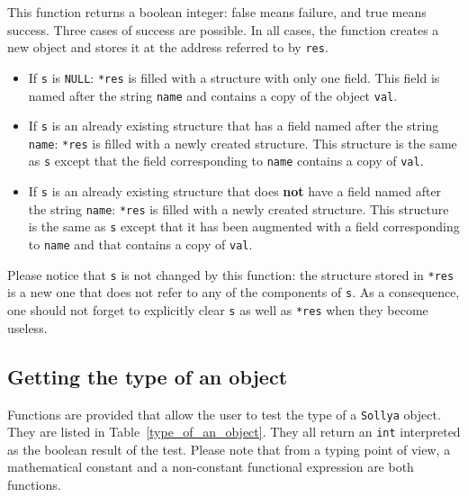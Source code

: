 \documentclass[a4paper]{article}
\newcommand{\sollya}{\texttt{Sollya}\xspace}
\begin{document}
This function returns a boolean integer: false means failure, and true means success. Three cases of success are possible. In all cases, the function creates a new object and stores it at the address referred to by \texttt{res}.
\begin{itemize}
\item  If \texttt{s} is \texttt{NULL}: \texttt{*res} is filled with a structure with only one field. This field is named after the string \texttt{name} and contains a copy of the object \texttt{val}.
\item If \texttt{s} is an already existing structure that has a field named after the string \texttt{name}: \texttt{*res} is filled with a newly created structure. This structure is the same as \texttt{s} except that the field corresponding to \texttt{name} contains a copy of \texttt{val}.
\item If \texttt{s} is an already existing structure that does \textbf{not} have a field named after the string \texttt{name}: \texttt{*res} is filled with a newly created structure. This structure is the same as \texttt{s} except that it has been augmented with a field corresponding to \texttt{name} and that contains a copy of \texttt{val}.
\end{itemize}
Please notice that \texttt{s} is not changed by this function: the structure stored in \texttt{*res} is a new one that does not refer to any of the components of \texttt{s}. As a consequence, one should not forget to explicitly clear \texttt{s} as well as \texttt{*res} when they become useless.

\subsection{Getting the type of an object}
Functions are provided that allow the user to test the type of a \sollya object. They are listed in Table~\ref{type_of_an_object}. They all return an \verb|int| interpreted as the boolean result of the test. Please note that from a typing point of view, a mathematical constant and a non-constant functional expression are both functions.
\end{document}
